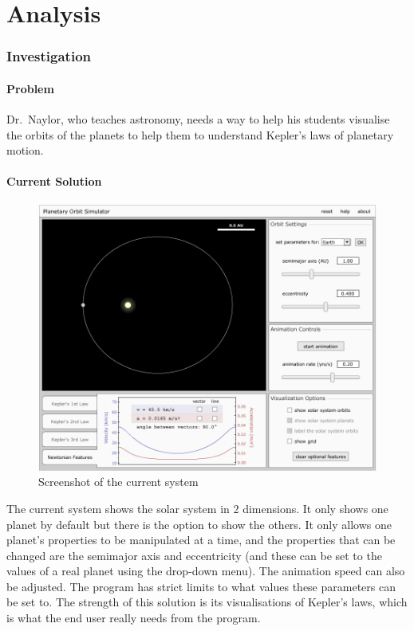 \part{Analysis}

\section{Investigation}

\subsection{Problem}
Dr.~Naylor, who teaches astronomy, needs a way to help his students visualise
the orbits of the planets to help them to understand Kepler's laws of planetary
motion.

\subsection{Current Solution}
\begin{figure}[h]
	\includegraphics[width=\textwidth]{./img/existing-solution.png}
	\caption{Screenshot of the current system}
	\label{fig:existing-solution}
\end{figure}
The current system shows the solar system in 2 dimensions. It only shows one
planet by default but there is the option to show the others. It only allows one
planet's properties to be manipulated at a time, and the properties that can be
changed are the semimajor axis and eccentricity (and these can be set to the
values of a real planet using the drop-down menu). The animation speed can also
be adjusted. The program has strict limits to what values these parameters can
be set to. The strength of this solution is its visualisations of Kepler's laws,
which is what the end user really needs from the program.

